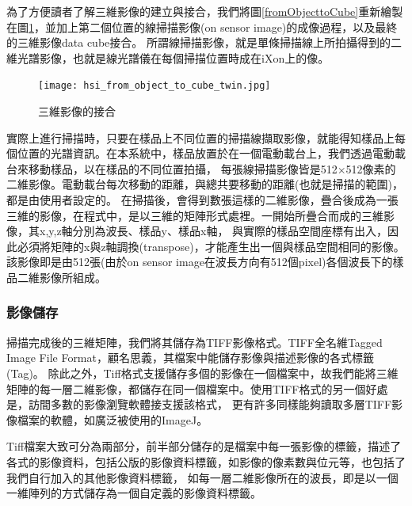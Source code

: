 \documentclass[12pt]{article}
\begin{document}
為了方便讀者了解三維影像的建立與接合，我們將圖\ref{fromObjecttoCube}重新繪製在圖\ref{fig: form data cube}，並加上第二個位置的線掃描影像(on sensor image)的成像過程，以及最終的三維影像data cube接合。
所謂線掃描影像，就是單條掃描線上所拍攝得到的二維光譜影像，也就是線光譜儀在每個掃描位置時成在iXon上的像。

\begin{figure}
    \centering
    \texttt{[image: hsi\_from\_object\_to\_cube\_twin.jpg]}
    \caption{三維影像的接合}
    \label{fig: form data cube}
\end{figure}



實際上進行掃描時，只要在樣品上不同位置的掃描線擷取影像，就能得知樣品上每個位置的光譜資訊。在本系統中，樣品放置於在一個電動載台上，我們透過電動載台來移動樣品，以在樣品的不同位置拍攝，
每張線掃描影像皆是512$\times$512像素的二維影像。電動載台每次移動的距離，與總共要移動的距離(也就是掃描的範圍)，都是由使用者設定的。
在掃描後，會得到數張這樣的二維影像，疊合後成為一張三維的影像，在程式中，是以三維的矩陣形式處裡。一開始所疊合而成的三維影像，其x,y,z軸分別為波長、樣品y、樣品x軸，
與實際的樣品空間座標有出入，因此必須將矩陣的x與z軸調換(transpose)，才能產生出一個與樣品空間相同的影像。該影像即是由512張(由於on sensor image在波長方向有512個pixel)各個波長下的樣品二維影像所組成。

\subsubsection{影像儲存}\label{section: saveTiff}
掃描完成後的三維矩陣，我們將其儲存為TIFF影像格式。TIFF全名維Tagged Image File Format，顧名思義，其檔案中能儲存影像與描述影像的各式標籤(Tag)。
除此之外，Tiff格式支援儲存多個的影像在一個檔案中，故我們能將三維矩陣的每一層二維影像，都儲存在同一個檔案中。使用TIFF格式的另一個好處是，訪間多數的影像瀏覽軟體接支援該格式，
更有許多同樣能夠讀取多層TIFF影像檔案的軟體，如廣泛被使用的ImageJ。

Tiff檔案大致可分為兩部分，前半部分儲存的是檔案中每一張影像的標籤，描述了各式的影像資料，包括公版的影像資料標籤，如影像的像素數與位元等，也包括了我們自行加入的其他影像資料標籤，
如每一層二維影像所在的波長，即是以一個一維陣列的方式儲存為一個自定義的影像資料標籤。
\end{document}

